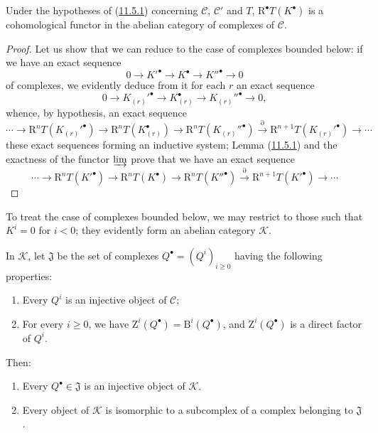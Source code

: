 \begin{proposition}[11.5.2]
\label{0.11.5.2}
Under the hypotheses of (\hyperref[0.11.5.1]{11.5.1}) concerning
$\mathcal C$, $\mathcal C'$ and $T$, $\mathrm R^\bullet T(K^\bullet)$ is a
cohomological functor in the abelian category of complexes of
$\mathcal C$.
\end{proposition}

\begin{proof}
Let us show that we can reduce to the case of complexes bounded below:
if we have an exact sequence
\[
  0\longrightarrow K'^\bullet\longrightarrow K^\bullet
  \longrightarrow K''^\bullet\longrightarrow0
\]
of complexes, we evidently deduce from it for each $r$ an exact sequence
\[
  0\longrightarrow K_{(r)}'^\bullet\longrightarrow K_{(r)}^\bullet
  \longrightarrow K_{(r)}''^\bullet\longrightarrow0,
\]
whence, by hypothesis, an exact sequence
\[
  \cdots\longrightarrow\mathrm R^nT(K_{(r)}'^\bullet)
  \longrightarrow\mathrm R^nT(K_{(r)}^\bullet)
  \longrightarrow\mathrm R^nT(K_{(r)}''^\bullet)
  \xrightarrow{\partial}\mathrm R^{n+1}T(K_{(r)}'^\bullet)
  \longrightarrow\cdots
\]
these exact sequences forming an inductive system; Lemma
(\hyperref[0.11.5.1]{11.5.1}) and the exactness of the functor $\varinjlim$
prove that we have an exact sequence
\[
  \cdots\longrightarrow\mathrm R^nT(K'^\bullet)
  \longrightarrow\mathrm R^nT(K^\bullet)
  \longrightarrow\mathrm R^nT(K''^\bullet)
  \xrightarrow{\partial}\mathrm R^{n+1}T(K'^\bullet)
  \longrightarrow\cdots
\]
\end{proof}

To treat the case of complexes bounded below, we may restrict to
those such that $K^i=0$ for $i<0$; they evidently form an abelian
category $\mathcal K$.

\begin{lemma}[11.5.2.1]
\label{0.11.5.2.1}
In $\mathcal K$, let $\mathfrak J$ be the set of complexes
$Q^\bullet=(Q^i)_{i\geq0}$ having the
following properties:
\begin{enumerate}
  \item[$1^\circ$] Every $Q^i$ is an injective object of $\mathcal C$;
  \item[$2^\circ$] For every $i\geq0$, we have
    $\mathrm Z^i(Q^\bullet)=\mathrm B^i(Q^\bullet)$, and
    $\mathrm Z^i(Q^\bullet)$ is a direct factor of $Q^i$.
\end{enumerate}
Then:
\begin{enumerate}
  \item[(i)] Every $Q^\bullet\in\mathfrak J$ is an injective object of
    $\mathcal K$.
  \item[(ii)] Every object of $\mathcal K$ is isomorphic to a subcomplex
    of a complex belonging to $\mathfrak J$.
\end{enumerate}
\end{lemma}

